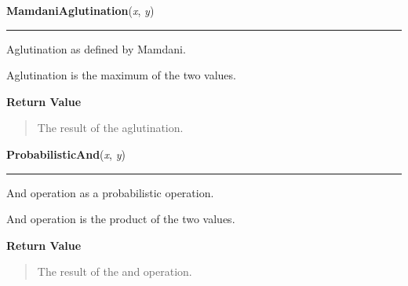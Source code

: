     \label{peach:fuzzy:norms:MamdaniAglutination}

    \vspace{0.5ex}

    \begin{boxedminipage}{\textwidth}

    \raggedright \textbf{MamdaniAglutination}(\textit{x}, \textit{y})

    \vspace{-1.5ex}

    \rule{\textwidth}{0.5\fboxrule}

Aglutination as defined by Mamdani.

Aglutination is the maximum of the two values.
    \vspace{1ex}

      \textbf{Return Value}
      \begin{quote}

The result of the aglutination.
      \end{quote}

    \vspace{1ex}

    \end{boxedminipage}

    \label{peach:fuzzy:norms:ProbabilisticAnd}

    \vspace{0.5ex}

    \begin{boxedminipage}{\textwidth}

    \raggedright \textbf{ProbabilisticAnd}(\textit{x}, \textit{y})

    \vspace{-1.5ex}

    \rule{\textwidth}{0.5\fboxrule}

And operation as a probabilistic operation.

And operation is the product of the two values.
    \vspace{1ex}

      \textbf{Return Value}
      \begin{quote}

The result of the and operation.
      \end{quote}

    \vspace{1ex}

    \end{boxedminipage}

